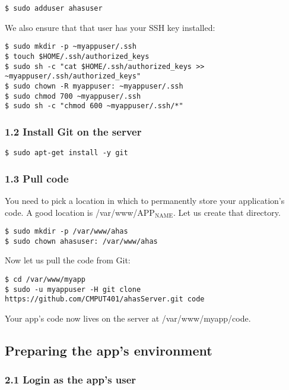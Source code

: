 \documentclass[11pt]{article}
\begin{document}
\begin{verbatim}
$ sudo adduser ahasuser
\end{verbatim}

We also ensure that that user has your SSH key installed:

\begin{verbatim}
$ sudo mkdir -p ~myappuser/.ssh
$ touch $HOME/.ssh/authorized_keys
$ sudo sh -c "cat $HOME/.ssh/authorized_keys >> ~myappuser/.ssh/authorized_keys"
$ sudo chown -R myappuser: ~myappuser/.ssh
$ sudo chmod 700 ~myappuser/.ssh
$ sudo sh -c "chmod 600 ~myappuser/.ssh/*"
\end{verbatim}

\subsubsection{1.2 Install Git on the server}
\label{sec:org784c258}

\begin{verbatim}
$ sudo apt-get install -y git
\end{verbatim}
\subsubsection{1.3 Pull code}
\label{sec:org96706e7}

You need to pick a location in which to permanently store your application's code. A good location is /var/www/APP\(_{\text{NAME}}\). Let us create that directory.

\begin{verbatim}
$ sudo mkdir -p /var/www/ahas
$ sudo chown ahasuser: /var/www/ahas
\end{verbatim}

Now let us pull the code from Git:

\begin{verbatim}
$ cd /var/www/myapp
$ sudo -u myappuser -H git clone https://github.com/CMPUT401/ahasServer.git code
\end{verbatim}
Your app's code now lives on the server at /var/www/myapp/code.

\subsection{Preparing the app's environment}
\label{sec:org934f328}

\subsubsection{2.1 Login as the app's user}
\label{sec:orgaa1e1d4}
\end{document}
